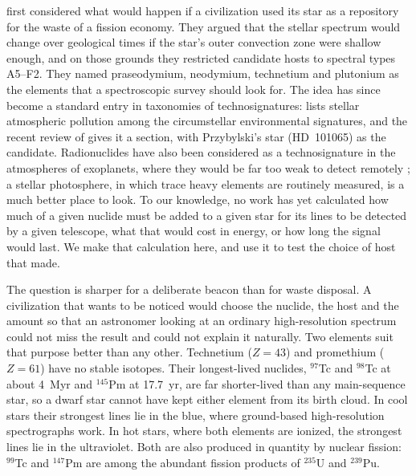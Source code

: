 \documentclass[final,5p]{elsarticle}
\begin{document}
\citet{Whitmire1980} first considered what would happen if a civilization used its star as a repository for the waste of a fission economy. They argued that the stellar spectrum would change over geological times if the star's outer convection zone were shallow enough, and on those grounds they restricted candidate hosts to spectral types A5--F2. They named praseodymium, neodymium, technetium and plutonium as the elements that a spectroscopic survey should look for. The idea has since become a standard entry in taxonomies of technosignatures: \citet{Wright2021strategies} lists stellar atmospheric pollution among the circumstellar environmental signatures, and the recent review of \citet{Vidal2026} gives it a section, with Przybylski's star (HD~101065) as the candidate. Radionuclides have also been considered as a technosignature in the atmospheres of exoplanets, where they would be far too weak to detect remotely \citep{HaqqMisra2024}; a stellar photosphere, in which trace heavy elements are routinely measured, is a much better place to look. To our knowledge, no work has yet calculated how much of a given nuclide must be added to a given star for its lines to be detected by a given telescope, what that would cost in energy, or how long the signal would last. We make that calculation here, and use it to test the choice of host that \citet{Whitmire1980} made.

The question is sharper for a deliberate beacon than for waste disposal. A civilization that wants to be noticed would choose the nuclide, the host and the amount so that an astronomer looking at an ordinary high-resolution spectrum could not miss the result and could not explain it naturally. Two elements suit that purpose better than any other. Technetium ($Z=43$) and promethium ($Z=61$) have no stable isotopes. Their longest-lived nuclides, $^{97}$Tc and $^{98}$Tc at about 4~Myr and $^{145}$Pm at 17.7~yr, are far shorter-lived than any main-sequence star, so a dwarf star cannot have kept either element from its birth cloud. In cool stars their strongest lines lie in the blue, where ground-based high-resolution spectrographs work. In hot stars, where both elements are ionized, the strongest lines lie in the ultraviolet. Both are also produced in quantity by nuclear fission: $^{99}$Tc and $^{147}$Pm are among the abundant fission products of $^{235}$U and $^{239}$Pu.
\end{document}
